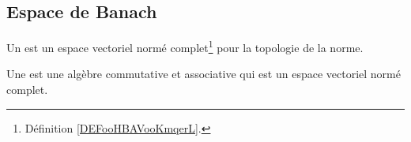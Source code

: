 \subsection{Espace de Banach}


\begin{definition}  \label{DefVKuyYpQ}
	Un  est un espace vectoriel normé complet\footnote{Définition \ref{DEFooHBAVooKmqerL}.} pour la topologie de la norme.

	Une  est une algèbre commutative et associative qui est un espace vectoriel normé complet.
\end{definition}


